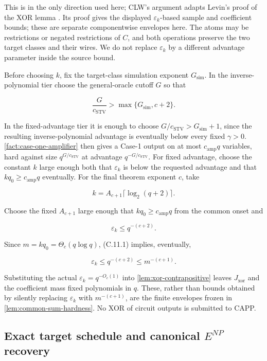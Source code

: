 \documentclass[11pt,letterpaper]{article}
\newcommand{\cref}[1]{\ref{#1}}
\theoremstyle{definition}
\theoremstyle{remark}
\begin{document}
This is \cite[Lemma 3.8]{CLW20} in the only direction used here; CLW's
argument adapts Levin's proof of the XOR lemma \cite{Lev87}. Its
proof gives the displayed \(\varepsilon_k\)-based sample and coefficient
bounds; these are separate componentwise envelopes here. The atoms may
be restrictions or negated restrictions of \(C\), and both operations
preserve the two target classes and their wires. We do not replace
\(\varepsilon_k\) by a different advantage parameter inside the source
bound.

Before choosing \(k\), fix the target-class simulation exponent
\(G_{\mathrm{sim}}\). In the inverse-polynomial tier choose the
general-oracle cutoff \(G\) so that

\[
\frac{G}{c_{\mathrm{STV}}}
{}>{}
\max\{G_{\mathrm{sim}},c+2\}.
\]

In the fixed-advantage tier it is enough to choose
\(G/c_{\mathrm{STV}}>G_{\mathrm{sim}}+1\), since the resulting
inverse-polynomial advantage is eventually below every fixed
\(\gamma>0\). \cref{fact:case-one-amplifier} then gives a Case-1 output on at most
\(c_{\mathrm{amp}}q\) variables, hard against size
\(q^{G/c_{\mathrm{STV}}}\) at advantage \(q^{-G/c_{\mathrm{STV}}}\). For
fixed advantage, choose the constant \(k\) large enough both that
\(\varepsilon_k\) is below the requested advantage and that
\(kq_0\ge c_{\mathrm{amp}}q\) eventually. For the final theorem exponent
\(c\), take

\[
k=A_{c+1}\lceil\log_2(q+2)\rceil.
\]

Choose the fixed \(A_{c+1}\) large enough that
\(kq_0\ge c_{\mathrm{amp}}q\) from the common onset and

\[
\varepsilon_k\le q^{-(c+2)}.
\tag{C.11.1}
\]

Since \(m=kq_0=\Theta_c(q\log q)\), (C.11.1) implies, eventually,

\[
\varepsilon_k
\le
q^{-(c+2)}
\le
m^{-(c+1)}.
\tag{C.11.2}
\]

Substituting the actual \(\varepsilon_k=q^{-O_c(1)}\) into \cref{lem:xor-contrapositive}
leaves \(J_{\mathrm{xor}}\) and the coefficient mass fixed polynomials
in \(q\). These, rather than bounds obtained by silently replacing
\(\varepsilon_k\) with \(m^{-(c+1)}\), are the finite envelopes frozen
in \cref{lem:common-sum-hardness}. No XOR of circuit outputs is submitted to CAPP.

\subsection{\texorpdfstring{Exact target schedule and canonical
\(E^{NP}\)
recovery}{Exact target schedule and canonical E\^{}\{NP\} recovery}}\label{c12-exact-target-schedule-and-canonical-enp-recovery}
\end{document}

